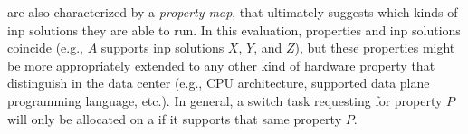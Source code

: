  are also characterized by a \textit{property map}, that ultimately suggests which kinds of \gls{inp} solutions they are able to run.
In this evaluation, properties and \gls{inp} solutions coincide (e.g.,  $A$ supports \gls{inp} solutions $X$, $Y$, and $Z$), but these properties might be more appropriately extended to any other kind of hardware property that distinguish  in the data center (e.g., CPU architecture, supported data plane programming language, etc.).
In general, a switch task requesting for property $P$ will only be allocated on a  if it supports that same property $P$.